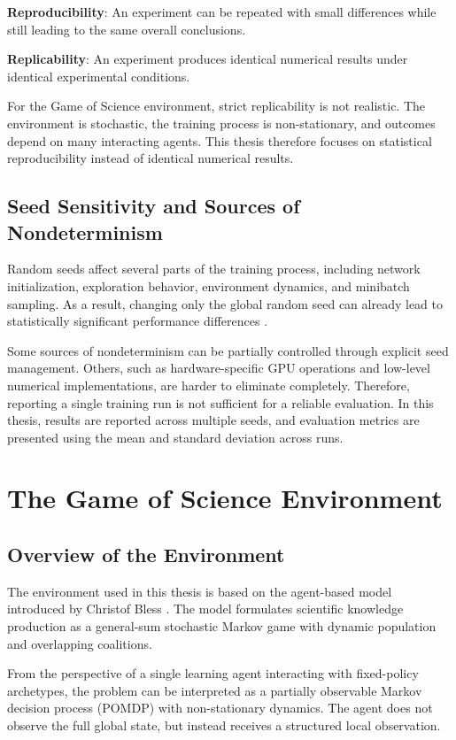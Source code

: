 \documentclass[english,bachelor]{hsluthesis}
\begin{document}
\textbf{Reproducibility}: An experiment can be repeated with small differences while still leading to the same overall conclusions.

\textbf{Replicability}: An experiment produces identical numerical results under identical experimental conditions.

For the Game of Science environment, strict replicability is not realistic. The environment is stochastic, the training process is non-stationary, and outcomes depend on many interacting agents. This thesis therefore focuses on statistical reproducibility instead of identical numerical results.

\subsection{Seed Sensitivity and Sources of Nondeterminism}

Random seeds affect several parts of the training process, including network initialization, exploration behavior, environment dynamics, and minibatch sampling. As a result, changing only the global random seed can already lead to statistically significant performance differences \cite{Nagarajan2018TheIO}.

Some sources of nondeterminism can be partially controlled through explicit seed management. Others, such as hardware-specific GPU operations and low-level numerical implementations, are harder to eliminate completely. Therefore, reporting a single training run is not sufficient for a reliable evaluation. In this thesis, results are reported across multiple seeds, and evaluation metrics are presented using the mean and standard deviation across runs.

\section{The Game of Science Environment}

\subsection{Overview of the Environment}
The environment used in this thesis is based on the agent-based model introduced by Christof Bless \cite{bless_game_of_science_2026}. The model formulates scientific knowledge production as a general-sum stochastic Markov game with dynamic population and overlapping coalitions.

From the perspective of a single learning agent interacting with fixed-policy archetypes, the problem can be interpreted as a partially observable Markov decision process (POMDP) with non-stationary dynamics. The agent does not observe the full global state, but instead receives a structured local observation.
\end{document}
